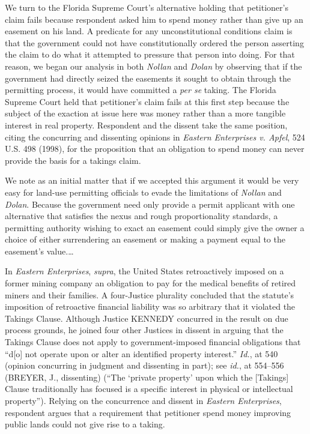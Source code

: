 
We turn to the Florida Supreme Court's alternative holding that petitioner's
claim fails because respondent asked him to spend money rather than give up an
easement on his land. A predicate for any unconstitutional conditions claim is
that the government could not have constitutionally ordered the person asserting
the claim to do what it attempted to pressure that person into doing. For that
reason, we began our analysis in both \textit{Nollan} and \textit{Dolan} by
observing that if the government had directly seized the easements it sought to
obtain through the permitting process, it would have committed a \textit{per se}
taking. The Florida Supreme Court held that petitioner's claim fails at this
first step because the subject of the exaction at issue here was money rather
than a more tangible interest in real property. Respondent and the dissent take
the same position, citing the concurring and dissenting opinions in
\textit{Eastern Enterprises v. Apfel}, 524 U.S. 498 (1998), for the proposition
that an obligation to spend money can never provide the basis for a takings
claim.

We note as an initial matter that if we accepted this argument it would be very
easy for land-use permitting officials to evade the limitations of
\textit{Nollan} and \textit{Dolan}. Because the government need only provide a
permit applicant with one alternative that satisfies the nexus and rough
proportionality standards, a permitting authority wishing to exact an easement
could simply give the owner a choice of either surrendering an easement or
making a payment equal to the easement's value.\ldots



In \textit{Eastern Enterprises}, \textit{supra}, the United States retroactively
imposed on a former mining company an obligation to pay for the medical benefits
of retired miners and their families. A four-Justice plurality concluded that
the statute's imposition of retroactive financial liability was so arbitrary
that it violated the Takings Clause. Although Justice KENNEDY concurred in the
result on due process grounds, he joined four other Justices in dissent in
arguing that the Takings Clause does not apply to government-imposed financial
obligations that ``d[o] not operate upon or alter an identified property
interest.'' \textit{Id.}, at 540 (opinion concurring in judgment and dissenting
in part); see \textit{id.}, at 554--556 (BREYER, J., dissenting) (``The `private
property' upon which the [Takings] Clause traditionally has focused is a
specific interest in physical or intellectual property''). Relying on the
concurrence and dissent in \textit{Eastern Enterprises}, respondent argues that
a requirement that petitioner spend money improving public lands could not give
rise to a taking.

